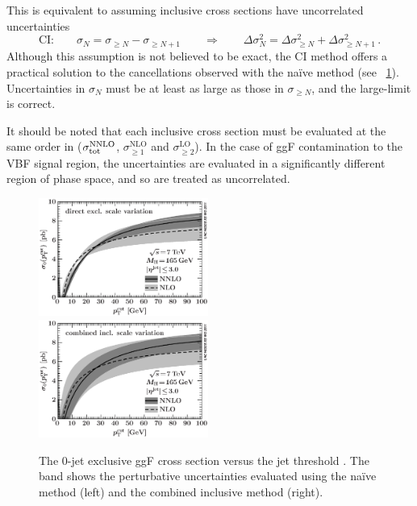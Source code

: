 This is equivalent to assuming inclusive cross sections have uncorrelated uncertainties
\begin{equation}
	\text{CI:} \quad\quad
	\sigma_N = \sigma_{\geq N} - \sigma_{\geq N+1}
	\quad\quad\Rightarrow\quad\quad
	\Delta\sigma_N^2 = \Delta\sigma_{\geq N}^2 + \Delta\sigma_{\geq N+1}^2 \,.
\end{equation}
Although this assumption is not believed to be exact, the CI method offers a practical 
solution to the cancellations observed with the na\"{i}ve method (see 
\Figure~\ref{fig:signal:ggf_sigma0_CI}). Uncertainties in $\sigma_{N}$ must be at least 
as large as those in $\sigma_{\geq N}$, and the large-\ptcut limit is correct. 

It should be noted that each inclusive cross section must be evaluated at the same order 
in \alphaS (\eg $\sigma_{\text{tot}}^{\text{NNLO}}$, $\sigma_{\geq1}^{\text{NLO}}$ and 
$\sigma_{\geq2}^{\text{LO}}$). In the case of \ac{ggF} contamination to the \ac{VBF} 
signal region, the uncertainties are evaluated in a significantly different region of 
phase space, and so are treated as uncorrelated.

\begin{figure}
	\includegraphics[width=0.495\textwidth]{tex/signal/sigma0_naive}
	\hfill
	\includegraphics[width=0.495\textwidth]{tex/signal/sigma0_CI}
	\caption{The 0-jet exclusive ggF cross section versus the jet \pt threshold 
	\cite{YR2}. The band shows the perturbative uncertainties evaluated using the 
	na\"{i}ve method (left) and the combined inclusive method (right).}
	\label{fig:signal:ggf_sigma0_CI}
\end{figure}


